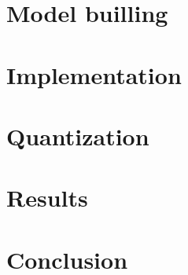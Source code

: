 \documentclass{article}
\begin{document}
    \section{Model builling}
    
    \section{Implementation}
    
    \section{Quantization}
    
    \section{Results}
    
    \section{Conclusion}
\end{document}
